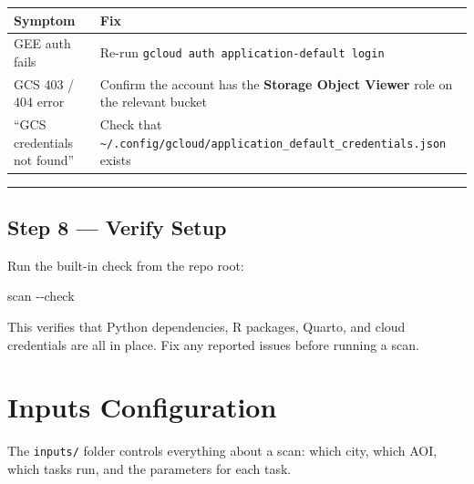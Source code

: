 \documentclass[
  letterpaper,
  DIV=11,
  numbers=noendperiod]{scrreprt}
\newenvironment{Shaded}{\begin{snugshade}}{\end{snugshade}}
\newcommand{\AttributeTok}[1]{\textcolor[rgb]{0.40,0.45,0.13}{#1}}
\newcommand{\ExtensionTok}[1]{\textcolor[rgb]{0.00,0.23,0.31}{#1}}
\newcounter{none} %
\begin{document}
{\def\LTcaptype{none} %
\begin{longtable}[]{@{}
  >{\raggedright\arraybackslash}p{}
  >{\raggedright\arraybackslash}p{}@{}}
\toprule\noalign{}
\begin{minipage}[b]{\linewidth}\raggedright
Symptom
\end{minipage} & \begin{minipage}[b]{\linewidth}\raggedright
Fix
\end{minipage} \\
\midrule\noalign{}
\endhead
\bottomrule\noalign{}
\endlastfoot
GEE auth fails & Re-run
\texttt{gcloud\ auth\ application-default\ login} \\
GCS 403 / 404 error & Confirm the account has the \textbf{Storage Object
Viewer} role on the relevant bucket \\
``GCS credentials not found'' & Check that
\texttt{\textasciitilde{}/.config/gcloud/application\_default\_credentials.json}
exists \\
\end{longtable}
}

\begin{center}\rule{0.5\linewidth}{0.5pt}\end{center}

\section{Step 8 --- Verify Setup}\label{step-8-verify-setup}

Run the built-in check from the repo root:

\begin{Shaded}
\begin{Highlighting}[]
\ExtensionTok{scan} \AttributeTok{{-}{-}check}
\end{Highlighting}
\end{Shaded}

This verifies that Python dependencies, R packages, Quarto, and cloud
credentials are all in place. Fix any reported issues before running a
scan.

\chapter{Inputs Configuration}\label{inputs-configuration}

The \texttt{inputs/} folder controls everything about a scan: which
city, which AOI, which tasks run, and the parameters for each task.
\end{document}
